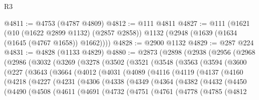 \begin{lexlean}{R3}
\begin{coremodule}
@4811 := @4753 (@4787 @4809)
@4812 := @111 @4811
@4827 := @111
    (@1621
      (@10 (@1622 @2899 @1132) (@2857 @2858))
      @1132
      (@2948 (@1639 (@1634 (@1645 (@4767 @1658)) @1662))))
@4828 := @2900 @1132
@4829 := @287 @224
@4831 := @4828 (@1133 @4829)
@4880 := @2873
    (@2898
      (@2938
        (@2956
          (@2968
            (@2986
              (@3032
                (@3269
                  (@3278
                    (@3502
                      (@3521
                        (@3548
                          (@3563
                            (@3594
                              (@3600
                                (@227
                                  (@3643
                                    (@3664
                                      (@4012
                                        (@4031
                                          (@4089
                                            (@4116
                                              (@4119
                                                (@4137
                                                  (@4160
                                                    (@4218
                                                      (@4227
                                                        (@4231
                                                          (@4306
                                                            (@4338
                                                              (@4349
                                                                (@4364
                                                                  (@4382
                                                                    (@4432
                                                                      (@4450
                                                                        (@4490
                                                                          (@4508
                                                                            (@4611
                                                                              (@4691
                                                                                (@4732
                                                                                  (@4751
                                                                                    (@4761
                                                                                      (@4778
                                                                                        (@4785
                                                                                          (@4812

\end{coremodule}
\end{lexlean}
